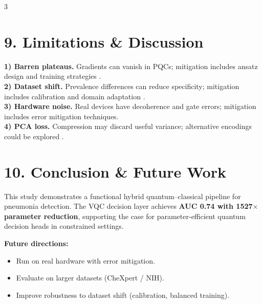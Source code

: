 \documentclass[a0,portrait]{a0poster}
\begin{document}
\begin{multicols}{3}
\color{UWBBlue}\section*{9. Limitations \& Discussion}
\color{TechGrey}

\noindent
\textbf{1) Barren plateaus.} Gradients can vanish in PQCs; mitigation includes ansatz design and training strategies \cite{McClean2018, Cerezo2021}.\\
\textbf{2) Dataset shift.} Prevalence differences can reduce specificity; mitigation includes calibration and domain adaptation \cite{Zech2018}.\\
\textbf{3) Hardware noise.} Real devices have decoherence and gate errors; mitigation includes error mitigation techniques.\\
\textbf{4) PCA loss.} Compression may discard useful variance; alternative encodings could be explored \cite{SharmaEnc2023}.


\color{UWBBlue}\section*{10. Conclusion \& Future Work}
\color{TechGrey}

\noindent
This study demonstrates a functional hybrid quantum--classical pipeline for pneumonia detection. The VQC decision layer achieves \textbf{AUC 0.74 with 1527\(\times\) parameter reduction}, supporting the case for parameter-efficient quantum decision heads in constrained settings. \vspace{0.15cm}

\textbf{Future directions:}
\begin{itemize}[leftmargin=0.9em,itemsep=0.1em,topsep=0.1em]
\item Run on real hardware with error mitigation.
\item Evaluate on larger datasets (CheXpert / NIH).
\item Improve robustness to dataset shift (calibration, balanced training).
\end{itemize}



\end{multicols}
\end{document}
